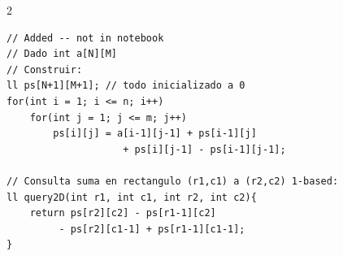 \documentclass[10pt,a4paper]{article}
\begin{document}
\begin{multicols}{2}
\begin{lstlisting}
// Added -- not in notebook
// Dado int a[N][M]
// Construir:
ll ps[N+1][M+1]; // todo inicializado a 0
for(int i = 1; i <= n; i++)
    for(int j = 1; j <= m; j++)
        ps[i][j] = a[i-1][j-1] + ps[i-1][j]
                    + ps[i][j-1] - ps[i-1][j-1];

// Consulta suma en rectangulo (r1,c1) a (r2,c2) 1-based:
ll query2D(int r1, int c1, int r2, int c2){
    return ps[r2][c2] - ps[r1-1][c2]
         - ps[r2][c1-1] + ps[r1-1][c1-1];
}
\end{lstlisting}

\end{multicols}
\newpage


\end{document}
